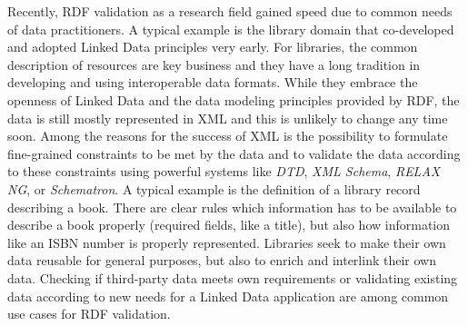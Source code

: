 \documentclass[a4paper,fontsize=11pt]{scrartcl}
\begin{document}
Recently, RDF validation as a research field gained speed due to common needs of data practitioners. A typical example is the library domain that co-developed and adopted Linked Data principles very early. For libraries, the common description of resources are key business and they have a long tradition in developing and using interoperable data formats. While they embrace the openness of Linked Data and the data modeling principles provided by RDF, the data is still mostly represented in XML and this is unlikely to change any time soon. 
Among the reasons for the success of XML is the possibility to formulate fine-grained constraints to be met by the data and to validate the data according to these constraints using powerful systems like \emph{DTD}, \emph{XML Schema}, \emph{RELAX NG}, or \emph{Schematron}.
A typical example is the definition of a library record describing a book. There are clear rules which information has to be available to describe a book properly (required fields, like a title), but also how information like an ISBN number is properly represented. Libraries seek to make their own data reusable for general purposes, but also to enrich and interlink their own data. Checking if third-party data meets own requirements or validating existing data according to new needs for a Linked Data application are among common use cases for RDF validation.
\end{document}
